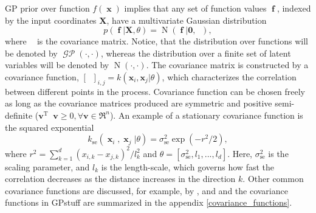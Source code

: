 \documentclass[twoside,11pt]{article}
\DeclareMathOperator{\Kff}{\mathbf{K}_{f,f}}
\DeclareMathOperator{\x}{\mathbf{x}}
\DeclareMathOperator{\f}{\mathbf{f}}
\DeclareMathOperator{\GP}{\mathcal{GP}}
\DeclareMathOperator{\N}{N}
\newcommand{\mb}{\mathbf}
\newcommand{\pkg}[1]{{\fontseries{b}\selectfont #1}}
\begin{document}
GP prior over function $f(\x)$ implies that any set of function values
$\f$, indexed by the input coordinates $\mb{X}$, have a multivariate
Gaussian distribution
%
\begin{equation}\label{eq_GP_prior}
p(\f|\mb{X},\theta) = \N(\f|\mb{0}, \Kff),
\end{equation}
% 
where $\Kff$ is the covariance matrix. Notice, that the distribution
over functions will be denoted by $\GP(\cdot,\cdot)$, whereas the
distribution over a finite set of latent variables will be denoted by
$\N(\cdot,\cdot)$. The covariance matrix is constructed by a
covariance function, $[\Kff]_{i,j} = k(\mb{x}_i, \mb{x}_j|\theta)$,
which characterizes the correlation between different points in the
process.  Covariance function can be chosen freely as long as the
covariance matrices produced are symmetric and positive semi-definite
($\mb{v}^{\text{T}}\Kff\mb{v}\geq 0, \forall \mb{v}\in \Re^n$). An
example of a stationary covariance function is the squared exponential
%
\begin{equation}
k_{\mathrm{se}}(\x_i,\x_j|\theta)=\sigma_{\mathrm{se}}^2\exp(-r^2/2),
\end{equation}
%
where $r^2 = \sum_{k=1}^d (x_{i,k}-x_{j,k})^2/l_k^2$ and $\theta =
[\sigma_{\mathrm{se}}^2, l_1,...,l_d]$. Here, $\sigma_{\mathrm{se}}^2$
is the scaling parameter, and $l_k$ is the length-scale, which governs
how fast the correlation decreases as the distance increases in the
direction $k$. Other common covariance functions are discussed, for
example, by \citet{Diggle+Ribeiro:2007},
\citet{Finkenstadt+Held+Isham:2007} and
\citet{Rasmussen+Williams:2006} and the covariance functions in
\pkg{GPstuff} are summarized in the appendix
\ref{covariance_functions}.
\end{document}
